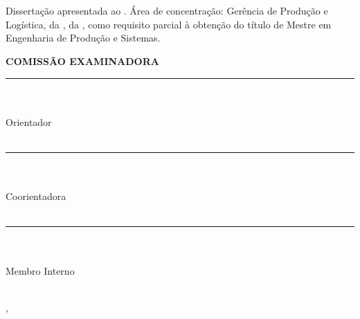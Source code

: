 \begin{center}
    {\MakeUppercase{\textbf{\aluno}} \\ [1cm]

    \MakeUppercase{\textbf{\titulo}} \\ [1cm]

    \hspace{.45\textwidth} %
        \begin{minipage}{.5\textwidth}
        \noindent Dissertação apresentada ao \curso. Área de concentração: Gerência de Produção e Logística, da \departamento, da \universidade, como requisito parcial à obtenção do título de Mestre em Engenharia de Produção e Sistemas. \\ [5mm]
        \end{minipage}
    \textbf{COMISSÃO EXAMINADORA} \\ [1cm]
    
    \rule{5cm}{.1mm} \\ \orientador \\ Orientador\\ \universidade \\ [5mm]

    \rule{5cm}{.1mm} \\ \coorientador \\ Coorientadora \\ \universidade \\ [5mm]

    \rule{5cm}{.1mm} \\ \convidadoa \\ Membro Interno \\ \univconvidadoa \\ [5mm]
    
    
\hspace{5cm}
  
    
    \cidade, \datadefesa
    }
\end{center}
